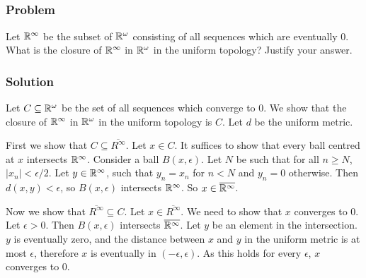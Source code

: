 
\setcounter{subsection}{4} %
\subsection{}

\subsubsection{Problem}
Let $\mathbb R^\infty$ be the subset of $\mathbb R^\omega$ consisting of all sequences which are eventually $0$. What is the closure of $\mathbb R^\infty$ in $\mathbb R^\omega$ in the uniform topology? Justify your answer.

\subsubsection{Solution}
Let $C \subseteq \mathbb R^\omega$ be the set of all sequences which converge to $0$. We show that the closure of $\mathbb R^\infty$ in $\mathbb R^\omega$ in the uniform topology is $C$. Let $d$ be the uniform metric.

First we show that $C \subseteq \overline{R^\infty}$. Let $x \in C$. It suffices to show that every ball centred at $x$ intersects $\mathbb R^\infty$. Consider a ball $B(x, \epsilon)$. Let $N$ be such that for all $n \geq N$, $|x_n| < \epsilon/2$. Let $y \in \mathbb R^\infty$, such that $y_n = x_n$ for $n < N$ and $y_n = 0$ otherwise. Then $d(x,y) < \epsilon$, so $B(x, \epsilon)$ intersects $\mathbb R^\infty$. So $x \in \overline{\mathbb R^\infty}$.

Now we show that $\overline{R^\infty} \subseteq C$. Let $x \in \overline{R^\infty}$. We need to show that $x$ converges to $0$. Let $\epsilon > 0$. Then $B(x, \epsilon)$ intersects $\overline{\mathbb R^\infty}$. Let $y$ be an element in the intersection. $y$ is eventually zero, and the distance between $x$ and $y$ in the uniform metric is at most $\epsilon$, therefore $x$ is eventually in $(-\epsilon, \epsilon)$. As this holds for every $\epsilon$, $x$ converges to $0$.

